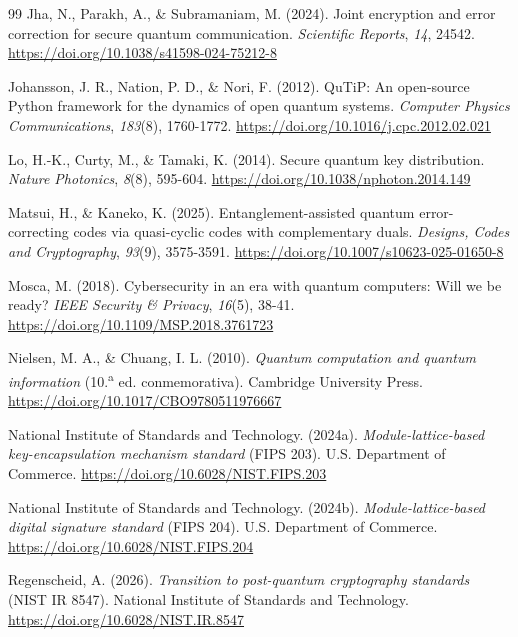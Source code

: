 \documentclass[12pt]{report}
\begin{document}
\begin{thebibliography}{99}
 Jha, N., Parakh, A., \& Subramaniam, M. (2024). Joint encryption and error correction for secure quantum communication. \textit{Scientific Reports}, \textit{14}, 24542. \url{https://doi.org/10.1038/s41598-024-75212-8}

 Johansson, J. R., Nation, P. D., \& Nori, F. (2012). QuTiP: An open-source Python framework for the dynamics of open quantum systems. \textit{Computer Physics Communications}, \textit{183}(8), 1760-1772. \url{https://doi.org/10.1016/j.cpc.2012.02.021}

 Lo, H.-K., Curty, M., \& Tamaki, K. (2014). Secure quantum key distribution. \textit{Nature Photonics}, \textit{8}(8), 595-604. \url{https://doi.org/10.1038/nphoton.2014.149}

 Matsui, H., \& Kaneko, K. (2025). Entanglement-assisted quantum error-correcting codes via quasi-cyclic codes with complementary duals. \textit{Designs, Codes and Cryptography}, \textit{93}(9), 3575-3591. \url{https://doi.org/10.1007/s10623-025-01650-8}

 Mosca, M. (2018). Cybersecurity in an era with quantum computers: Will we be ready? \textit{IEEE Security \& Privacy}, \textit{16}(5), 38-41. \url{https://doi.org/10.1109/MSP.2018.3761723}

 Nielsen, M. A., \& Chuang, I. L. (2010). \textit{Quantum computation and quantum information} (10.\textsuperscript{a} ed. conmemorativa). Cambridge University Press. \url{https://doi.org/10.1017/CBO9780511976667}

 National Institute of Standards and Technology. (2024a). \textit{Module-lattice-based key-encapsulation mechanism standard} (FIPS 203). U.S. Department of Commerce. \url{https://doi.org/10.6028/NIST.FIPS.203}

 National Institute of Standards and Technology. (2024b). \textit{Module-lattice-based digital signature standard} (FIPS 204). U.S. Department of Commerce. \url{https://doi.org/10.6028/NIST.FIPS.204}

 Regenscheid, A. (2026). \textit{Transition to post-quantum cryptography standards} (NIST IR 8547). National Institute of Standards and Technology. \url{https://doi.org/10.6028/NIST.IR.8547}


\end{thebibliography}
\end{document}
